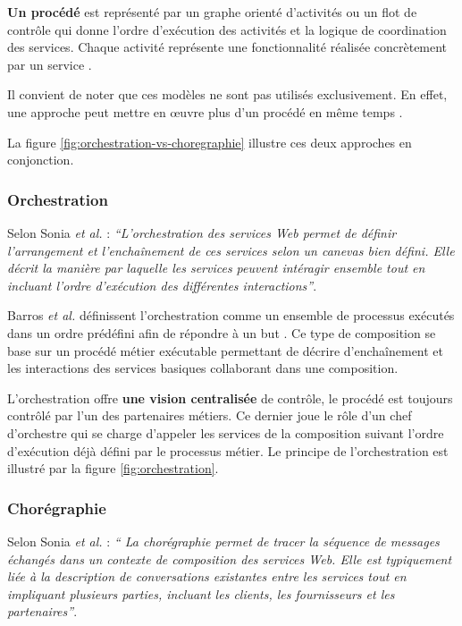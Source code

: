   \textbf{Un procédé} est représenté par un graphe orienté d'activités
  ou un flot de contrôle qui donne l'ordre d'exécution des activités
  et la logique de coordination des services. Chaque activité
  représente une fonctionnalité réalisée concrètement par un service
  \cite{chollet2009orchestration}.\medskip

  Il convient de noter que ces modèles ne sont pas utilisés
  exclusivement. En effet, une approche peut mettre en œuvre plus d'un
  procédé en même temps \cite{baryannis2010}.\medskip

  \newpage
  La figure \ref{fig:orchestration-vs-choregraphie} illustre ces deux
  approches en conjonction.

  

    \subsubsection{Orchestration}
    \label{sec:orchestration}
    Selon Sonia \emph{et al.} \cite{jamal2005environnement}:
    \emph{``L'orchestration des services Web permet de définir
      l'arrangement et l'enchaînement de ces services selon un
      canevas bien défini. Elle décrit la manière par laquelle les
      services peuvent intéragir ensemble tout en incluant l'ordre
      d'exécution des différentes interactions''}.\bigskip

    Barros \emph{et al.} \cite{barros2006standards} définissent
    l'orchestration comme un ensemble de processus exécutés dans un
    ordre prédéfini afin de répondre à un but
    \cite{lopez2008selection}. Ce type de composition se base sur un
    procédé métier exécutable permettant de décrire d'enchaînement et
    les interactions des services basiques collaborant dans une
    composition.\medskip

    L'orchestration offre \textbf{une vision centralisée} de contrôle,
    le procédé est toujours contrôlé par l'un des partenaires
    métiers. Ce dernier joue le rôle d'un chef d'orchestre qui se
    charge d'appeler les services de la composition suivant l'ordre
    d'exécution déjà défini par le processus métier. Le principe de
    l'orchestration est illustré par la figure
    \ref{fig:orchestration}.

    \subsubsection{Chorégraphie}
    \label{sec:choregraphie-sec}
    Selon Sonia \emph{et al.} \cite{jamal2005environnement} : \emph{``
      La chorégraphie permet de tracer la séquence de messages
      échangés dans un contexte de composition des services Web. Elle
      est typiquement liée à la description de conversations
      existantes entre les services tout en impliquant plusieurs
      parties, incluant les clients, les fournisseurs et les
      partenaires''}.\medskip

